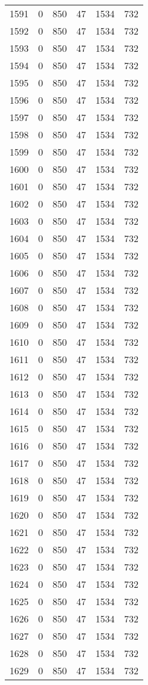 \documentclass[a4paper]{ctexart}
\begin{document}
\begin{longtable}{p{1cm}|p{2cm}|p{2cm}|p{2cm}|P{2cm}|p{2cm}}
		1591&0&850&47&1534&732\\
		1592&0&850&47&1534&732\\
		1593&0&850&47&1534&732\\
		1594&0&850&47&1534&732\\
		1595&0&850&47&1534&732\\
		1596&0&850&47&1534&732\\
		1597&0&850&47&1534&732\\
		1598&0&850&47&1534&732\\
		1599&0&850&47&1534&732\\
		1600&0&850&47&1534&732\\
		1601&0&850&47&1534&732\\
		1602&0&850&47&1534&732\\
		1603&0&850&47&1534&732\\
		1604&0&850&47&1534&732\\
		1605&0&850&47&1534&732\\
		1606&0&850&47&1534&732\\
		1607&0&850&47&1534&732\\
		1608&0&850&47&1534&732\\
		1609&0&850&47&1534&732\\
		1610&0&850&47&1534&732\\
		1611&0&850&47&1534&732\\
		1612&0&850&47&1534&732\\
		1613&0&850&47&1534&732\\
		1614&0&850&47&1534&732\\
		1615&0&850&47&1534&732\\
		1616&0&850&47&1534&732\\
		1617&0&850&47&1534&732\\
		1618&0&850&47&1534&732\\
		1619&0&850&47&1534&732\\
		1620&0&850&47&1534&732\\
		1621&0&850&47&1534&732\\
		1622&0&850&47&1534&732\\
		1623&0&850&47&1534&732\\
		1624&0&850&47&1534&732\\
		1625&0&850&47&1534&732\\
		1626&0&850&47&1534&732\\
		1627&0&850&47&1534&732\\
		1628&0&850&47&1534&732\\
		1629&0&850&47&1534&732\\

\end{longtable}
\end{document}
